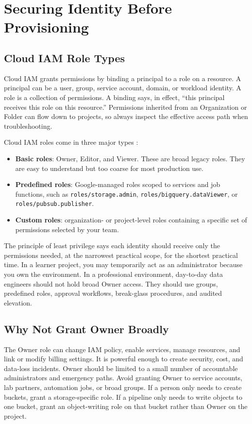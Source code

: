 \section{Securing Identity Before Provisioning}

\subsection{Cloud IAM Role Types}
Cloud IAM grants permissions by binding a principal to a role on a resource. A principal can be a user, group, service account, domain, or workload identity. A role is a collection of permissions. A binding says, in effect, ``this principal receives this role on this resource.'' Permissions inherited from an Organization or Folder can flow down to projects, so always inspect the effective access path when troubleshooting.

Cloud IAM roles come in three major types \cite{googlecloudiamoverview}:

\begin{itemize}
    \item \textbf{Basic roles}: Owner, Editor, and Viewer. These are broad legacy roles. They are easy to understand but too coarse for most production use.
    \item \textbf{Predefined roles}: Google-managed roles scoped to services and job functions, such as \texttt{roles/storage.admin}, \texttt{roles/bigquery.dataViewer}, or \texttt{roles/pubsub.publisher}.
    \item \textbf{Custom roles}: organization- or project-level roles containing a specific set of permissions selected by your team.
\end{itemize}

The principle of least privilege says each identity should receive only the permissions needed, at the narrowest practical scope, for the shortest practical time. In a learner project, you may temporarily act as an administrator because you own the environment. In a professional environment, day-to-day data engineers should not hold broad Owner access. They should use groups, predefined roles, approval workflows, break-glass procedures, and audited elevation.

\subsection{Why Not Grant Owner Broadly}
The Owner role can change IAM policy, enable services, manage resources, and link or modify billing settings. It is powerful enough to create security, cost, and data-loss incidents. Owner should be limited to a small number of accountable administrators and emergency paths. Avoid granting Owner to service accounts, lab partners, automation jobs, or broad groups. If a person only needs to create buckets, grant a storage-specific role. If a pipeline only needs to write objects to one bucket, grant an object-writing role on that bucket rather than Owner on the project.

